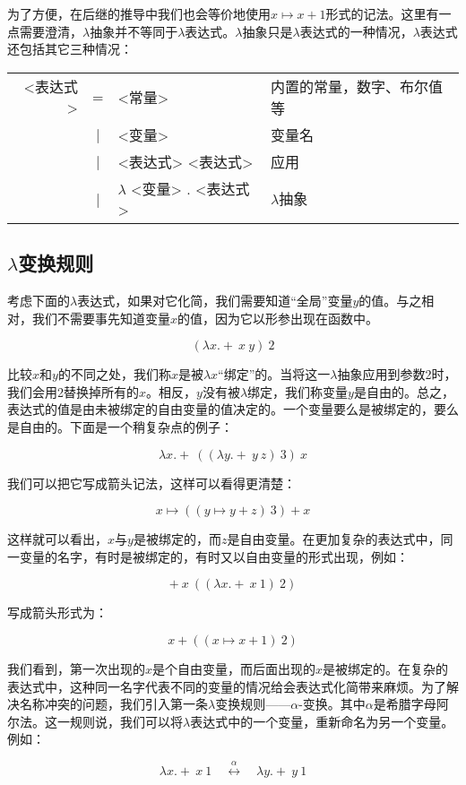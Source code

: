 \documentclass{article}
\begin{document}
为了方便，在后继的推导中我们也会等价地使用$x \mapsto x + 1$形式的记法。这里有一点需要澄清，$\lambda$抽象并不等同于$\lambda$表达式。$\lambda$抽象只是$\lambda$表达式的一种情况，$\lambda$表达式还包括其它三种情况：

\begin{tabular}{rcll}
<表达式> & = & <常量> & 内置的常量，数字、布尔值等 \\
        & | & <变量> & 变量名 \\
        & | & <表达式> <表达式> & 应用 \\
        & | & $\lambda$ <变量> . <表达式> & $\lambda$抽象
\end{tabular}

\subsection{$\lambda$变换规则}

考虑下面的$\lambda$表达式，如果对它化简，我们需要知道“全局”变量$y$的值。与之相对，我们不需要事先知道变量$x$的值，因为它以形参出现在函数中。

\[
(\lambda x . +\ x\ y)\ 2
\]

比较$x$和$y$的不同之处，我们称$x$是被$\lambda x$“绑定”的。当将这一$\lambda$抽象应用到参数2时，我们会用2替换掉所有的$x$。相反，$y$没有被$\lambda$绑定，我们称变量$y$是自由的。总之，表达式的值是由未被绑定的自由变量的值决定的。一个变量要么是被绑定的，要么是自由的。下面是一个稍复杂点的例子：

\[
\lambda x . +\ ((\lambda y . +\ y\ z)\ 3)\ x
\]

我们可以把它写成箭头记法，这样可以看得更清楚：

\[
x \mapsto ((y \mapsto y + z)\ 3) + x
\]

这样就可以看出，$x$与$y$是被绑定的，而$z$是自由变量。在更加复杂的表达式中，同一变量的名字，有时是被绑定的，有时又以自由变量的形式出现，例如：

\[
+\ x\ ((\lambda x . +\ x\ 1)\ 2)
\]

写成箭头形式为：

\[
x + ((x \mapsto x + 1)\ 2)
\]

我们看到，第一次出现的$x$是个自由变量，而后面出现的$x$是被绑定的。在复杂的表达式中，这种同一名字代表不同的变量的情况给会表达式化简带来麻烦。为了解决名称冲突的问题，我们引入第一条$\lambda$变换规则——$\alpha$-变换。其中$\alpha$是希腊字母阿尔法。这一规则说，我们可以将$\lambda$表达式中的一个变量，重新命名为另一个变量。例如：

\[
\lambda x . +\ x\ 1 \quad \overset{\alpha}{\longleftrightarrow} \quad \lambda y . +\ y\ 1
\]
\end{document}
